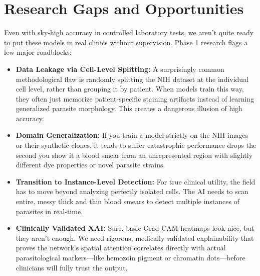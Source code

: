 \documentclass[conference]{IEEEtran}
\begin{document}
\section{Research Gaps and Opportunities}\label{sec:gaps}
Even with sky-high accuracy in controlled laboratory tests, we aren't quite ready to
put these models in real clinics without supervision. Phase 1 research flags a few
major roadblocks:
\begin{itemize}
\item \textbf{Data Leakage via Cell-Level Splitting:} A surprisingly common
methodological flaw is randomly splitting the NIH dataset at the individual cell
level, rather than grouping it by patient. When models train this way, they often just
memorize patient-specific staining artifacts instead of learning generalized parasite
morphology. This creates a dangerous illusion of high accuracy.
\item \textbf{Domain Generalization:} If you train a model strictly on the NIH images
or their synthetic clones, it tends to suffer catastrophic performance drops the
second you show it a blood smear from an unrepresented region with slightly different
dye properties or novel parasite strains.
\item \textbf{Transition to Instance-Level Detection:} For true clinical utility, the
field has to move beyond analyzing perfectly isolated cells. The AI needs to scan
entire, messy thick and thin blood smears to detect multiple instances of parasites in
real-time.
\item \textbf{Clinically Validated XAI:} Sure, basic Grad-CAM heatmaps look nice, but
they aren't enough. We need rigorous, medically validated explainability that proves
the network's spatial attention correlates directly with actual parasitological
markers---like hemozoin pigment or chromatin dots---before clinicians will fully trust
the output.
\end{itemize}
\end{document}
